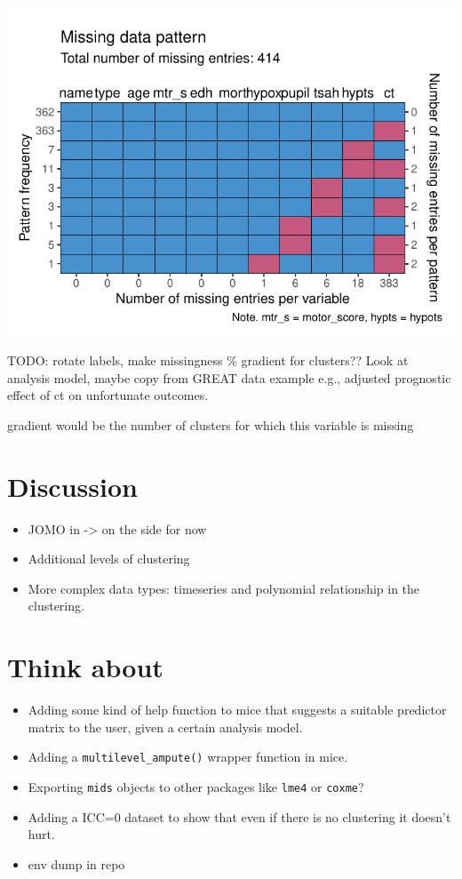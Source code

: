 \documentclass[
]{jss}
\begin{document}
\begin{CodeChunk}
\begin{center}\includegraphics{Manuscript_files/figure-latex/impact-3} \end{center}

\end{CodeChunk}

TODO: rotate labels, make missingness \% gradient for clusters?? Look at
analysis model, maybe copy from GREAT data example e.g., adjusted
prognostic effect of ct on unfortunate outcomes.

gradient would be the number of clusters for which this variable is
missing

\hypertarget{discussion}{%
\section{Discussion}\label{discussion}}

\begin{itemize}
\item
  JOMO in  -\textgreater{} on the side for now
\item
  Additional levels of clustering
\item
  More complex data types: timeseries and polynomial relationship in the
  clustering.
\end{itemize}

\hypertarget{think-about}{%
\section{Think about}\label{think-about}}

\begin{itemize}
\item
  Adding some kind of help function to mice that suggests a suitable
  predictor matrix to the user, given a certain analysis model.
\item
  Adding a \texttt{multilevel\_ampute()} wrapper function in mice.
\item
  Exporting \texttt{mids} objects to other packages like \texttt{lme4}
  or \texttt{coxme}?
\item
  Adding a ICC=0 dataset to show that even if there is no clustering it
  doesn't hurt.
\item
  env dump in repo
\end{itemize}

\renewcommand\refname{References}

\end{document}
